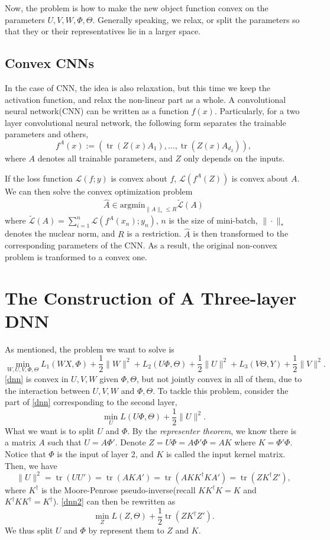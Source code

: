 \documentclass{article}
\DeclareMathOperator{\tr}{tr}
\begin{document}
Now, the problem is how to make the new object function convex on the parameters $U,V,W,\Phi,\Theta$. Generally speaking, we relax, or split the parameters so that they or their representatives lie in a larger space.

\subsection{Convex CNNs}
In the case of CNN, the idea is also relaxation, but this time we keep the activation function, and relax the non-linear part as a whole. A convolutional neural network(CNN) can be written as a function $f(x)$. Particularly, for a two layer convolutional neural network, the following form separates the trainable parameters and others,
\[f^A(x):=(\tr(Z(x)A_1),...,\tr(Z(x)A_{d_2})),\]
where $A$ denotes all trainable parameters, and $Z$ only depends on the inputs.

If the loss function $\mathcal{L}(f;y)$ is convex about $f$, $\mathcal{L}(f^A(Z))$ is convex about $A$. We can then solve the convex optimization problem
\begin{align*}
\widehat{A}\in\text{argmin}_{\|A\|_*\leq R}\tilde{\mathcal{L}}(A)
\end{align*}
where $\tilde{\mathcal{L}}(A)=\sum_{i=1}^n\mathcal{L}(f^A(x_n);y_n)$, $n$ is the size of mini-batch, $\|\cdot\|_*$ denotes the nuclear norm, and $R$ is a restriction. $\widehat{A}$ is then transformed to the corresponding parameters of the CNN. As a result, the original non-convex problem is tranformed to a convex one. 
\section{The Construction of A Three-layer DNN}
As mentioned, the problem we want to solve is 
\begin{equation}\label{dnn}
\min_{W,U,V,\Phi,\Theta}L_1(WX,\Phi)+\frac{1}{2}\|W\|^2+L_2(U\Phi,\Theta)+\frac{1}{2}\|U\|^2+L_3(V\Theta,Y)+\frac{1}{2}\|V\|^2.
\end{equation}
\eqref{dnn} is convex in $U,V,W$ given $\Phi,\Theta$, but not jointly convex in all of them, due to the interaction between $U,V,W$ and $\Phi,\Theta$. To tackle this problem, \cite{aslan2013convex} consider the part of \eqref{dnn} corresponding to the second layer,
\begin{equation}\label{dnn2}
	\min_U L(U\Phi,\Theta)+\frac{1}{2}\|U\|^2.
\end{equation}
What we want is to split $U$ and $\Phi$. By the \emph{representer theorem}, we know there is a matrix $A$ such that $U=A\Phi'$. Denote $Z=U\Phi=A\Phi'\Phi=AK$ where $K=\Phi'\Phi$. Notice that $\Phi$ is the input of layer 2, and $K$ is called the input kernel matrix. Then, we have 
\[\|U\|^2=\tr(UU')=\tr(AKA')=\tr(AKK^\dagger KA')=\tr(ZK^\dagger Z'),\]
where $K^\dagger$ is the Moore-Penrose pseudo-inverse(recall $KK^\dagger K=K$ and $K^\dagger KK^\dagger=K^\dagger$). \eqref{dnn2} can then be rewritten as
\begin{equation}\label{dnn3}
	\min_Z L(Z,\Theta)+\frac{1}{2}\tr(ZK^\dagger Z').
\end{equation}
We thus split $U$ and $\Phi$ by represent them to $Z$ and $K$.
\end{document}
